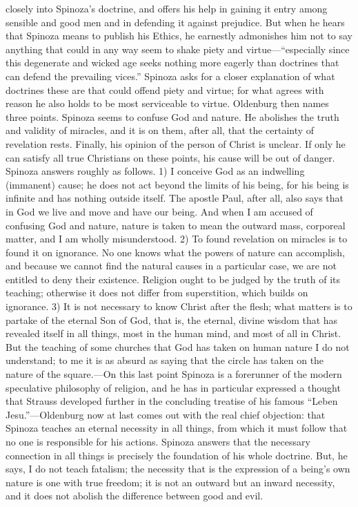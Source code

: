 \documentclass[12pt]{book}
\newcommand{\opage}[1]{\marginnote{\footnotesize\textit{[#1]}}}
\begin{document}
closely into Spinoza's doctrine, and offers his help in gaining it entry among
sensible and good men and in defending it against prejudice. But when he hears that
Spinoza means to publish his Ethics, he earnestly admonishes him not to say anything
that could in any way seem to shake piety and virtue---``especially since this
degenerate and wicked age seeks nothing more eagerly than doctrines that can defend the
prevailing vices.'' Spinoza asks for a closer explanation of what doctrines these are
that could offend piety and virtue; for what agrees with reason he also holds to be
most serviceable to virtue. Oldenburg then names three points. Spinoza seems to confuse
God and nature. He abolishes the truth and validity of miracles, and it is on them,
after all, that the certainty of revelation rests. Finally, his opinion of the person
of Christ is unclear. If only he can satisfy all true Christians on these points, his
cause will be out of danger. Spinoza answers roughly as follows. 1) I conceive God as
an indwelling (immanent) cause; he does not act beyond the limits of his being, for
his being is infinite and has nothing outside itself. The apostle Paul, after all, also
says that in God we live and move and have our being. And when I am accused of
confusing God and \opage{49}nature, nature is taken to mean the outward mass, corporeal
matter, and I am wholly misunderstood. 2) To found revelation on miracles is to found
it on ignorance. No one knows what the powers of nature can accomplish, and because we
cannot find the natural causes in a particular case, we are not entitled to deny their
existence. Religion ought to be judged by the truth of its teaching; otherwise it does
not differ from superstition, which builds on ignorance. 3) It is not necessary to know
Christ after the flesh; what matters is to partake of the eternal Son of God, that is,
the eternal, divine wisdom that has revealed itself in all things, most in the human
mind, and most of all in Christ. But the teaching of some churches that God has taken
on human nature I do not understand; to me it is as absurd as saying that the circle
has taken on the nature of the square.---On this last point Spinoza is a forerunner of
the modern speculative philosophy of religion, and he has in particular expressed a
thought that Strauss developed further in the concluding treatise of his famous
``Leben Jesu.''---Oldenburg now at last comes out with the real chief objection: that
Spinoza teaches an eternal necessity in all things, from which it must follow that no
one is responsible for his actions. Spinoza answers that the necessary connection in all
things is precisely the foundation of his whole doctrine. But, he says, I do not teach
fatalism; the necessity that is the expression of a being's own nature is one with true
freedom; it is not an outward but an inward necessity, and it does not abolish the
difference between good and evil.
\end{document}
